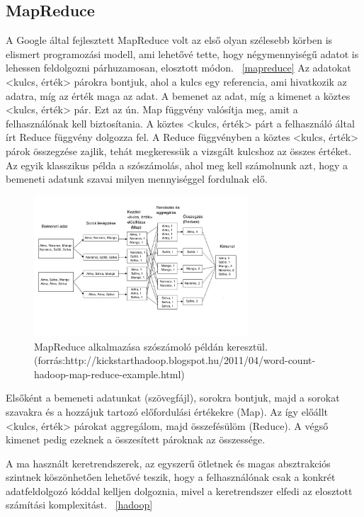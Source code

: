 \documentclass[a4paper,12pt]{article}
\begin{document}
\subsection{MapReduce}
A Google által fejlesztett MapReduce volt az első olyan szélesebb körben is elismert programozási modell, ami lehetővé tette, hogy négymennyiségű adatot is lehessen feldolgozni párhuzamosan, elosztott módon. ~\ref{mapreduce} Az adatokat <kulcs, érték> párokra bontjuk, ahol a kulcs egy referencia, ami hivatkozik az adatra, míg az érték maga az adat. A bemenet az adat, míg a kimenet a köztes <kulcs, érték> pár. Ezt az ún. Map függvény valósítja meg, amit a felhasználónak kell biztosítania. A köztes <kulcs, érték> párt a felhasználó által írt Reduce függvény dolgozza fel. A Reduce függvényben a köztes <kulcs, érték> párok összegzése  zajlik, tehát megkeressük a vizsgált kulcshoz az összes értéket. \linebreak
Az egyik klasszikus példa a szószámolás, ahol meg kell számolnunk azt, hogy a bemeneti adatunk szavai milyen mennyiséggel fordulnak elő.

\begin{figure}[ht!]
\centering
\includegraphics[width=80mm]{img/wordcountflow.jpg}
\caption{MapReduce alkalmazása szószámoló példán keresztül. (forrás:http://kickstarthadoop.blogspot.hu/2011/04/word-count-hadoop-map-reduce-example.html)
\label{wordcountflow}}
\end{figure}

Elsőként a bemeneti adatunkat (szövegfájl), sorokra bontjuk, majd a sorokat szavakra és a hozzájuk tartozó előfordulási értékekre (Map). Az így előállt <kulcs, érték> párokat aggregálom, majd összefésülöm (Reduce). A végső kimenet pedig ezeknek a összesített pároknak az összessége.

A ma használt keretrendszerek, az egyszerű ötletnek és magas absztrakciós szintnek köszönhetően lehetővé teszik, hogy a felhasználónak csak a konkrét adatfeldolgozó kóddal kelljen dolgoznia, mivel a keretrendszer elfedi az elosztott számítási komplexitást. ~\ref{hadoop}
\end{document}
